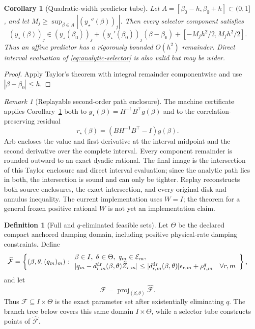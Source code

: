 \documentclass[11pt]{article}
\newtheorem{corollary}[theorem]{Corollary}
\theoremstyle{definition}
\newtheorem{definition}[theorem]{Definition}
\theoremstyle{remark}
\newtheorem{remark}[theorem]{Remark}
\newcommand{\Eset}{\mathcal E}
\newcommand{\proj}{\operatorname{proj}}
\begin{document}
\begin{corollary}[Quadratic-width predictor tube]
\label{cor:selector-taylor-tube}
Let \(A=[\beta_0-h,\beta_0+h]\subset(0,1]\), and let
\(M_j\ge\sup_{\beta\in A}|(y_\star''(\beta))_j|\).  Then every selector
component satisfies
\[
 (y_\star(\beta))_j\in
 (y_\star(\beta_0))_j+(y_\star'(\beta_0))_j(\beta-\beta_0)
 +[-M_jh^2/2,M_jh^2/2].
\]
Thus an affine predictor has a rigorously bounded \(O(h^2)\) remainder.  Direct
interval evaluation of \eqref{eq:analytic-selector} is also valid but may be
wider.
\end{corollary}
\begin{proof}
Apply Taylor's theorem with integral remainder componentwise and use
\(|\beta-\beta_0|\le h\).
\end{proof}

\begin{remark}[Replayable second-order path enclosure]
The machine certificate applies Corollary~\ref{cor:selector-taylor-tube} both
to \(y_\star(\beta)=H^{-1}B^\top g(\beta)\) and to the correlation-preserving
residual
\[
 r_\star(\beta)=(BH^{-1}B^\top-I)g(\beta).
\]
Arb encloses the value and first derivative at the interval midpoint and the
second derivative over the complete interval.  Every component remainder is
rounded outward to an exact dyadic rational.  The final image is the
intersection of this Taylor enclosure and direct interval evaluation; since
the analytic path lies in both, the intersection is sound and can only be
tighter.  Replay reconstructs both source enclosures, the exact intersection,
and every original disk and annulus inequality.  The current implementation
uses \(W=I\); the theorem for a general frozen positive rational \(W\) is not
yet an implementation claim.
\end{remark}

\begin{definition}[Full and \(q\)-eliminated feasible sets]
\label{def:feasible-spaces}
Let \(\Theta\) be the declared compact anchored damping domain, including
positive physical-rate damping constraints.  Define
\[
 \widehat{\mathcal F}=
 \left\{(\beta,\theta,(q_m)_m):
 \begin{array}{l}
 \beta\in I,\ \theta\in\Theta,\ q_m\in\Eset_m,\\
 |q_m-d^{\rm dr}_{r,m}(\beta,\theta)\widetilde Z_{r,m}|
 \le |d^{\rm dr}_{r,m}(\beta,\theta)|\epsilon_{r,m}
      +\rho^q_{r,m}\quad\forall r,m
 \end{array}\right\},
\]
and let
\[
 \mathcal F=\proj_{(\beta,\theta)}\widehat{\mathcal F}.
\]
Thus \(\mathcal F\subseteq I\times\Theta\) is the exact parameter set after
existentially eliminating \(q\).  The branch tree below covers this same
domain \(I\times\Theta\), while a selector tube constructs points of
\(\widehat{\mathcal F}\).
\end{definition}
\end{document}
